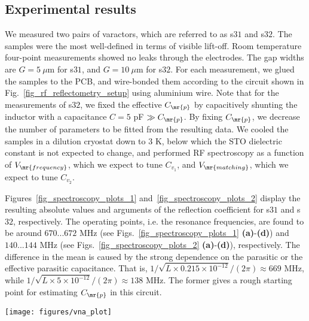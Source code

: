 \documentclass[10pt,a4paper,twoside]{article}
\begin{document}
\begin{multicols}{2}
\section{Experimental results}
We measured two pairs of varactors, which are referred to as s$31$ and s$32$. The samples were the most well-defined in terms of visible lift-off. Room temperature four-point measurements showed no leaks through the electrodes. The gap widths are $G = 5\ \mu$m for s$31$, and $G = 10\ \mu$m for s$32$. 
For each measurement, we glued the samples to the PCB, and wire-bonded them according to the circuit shown in Fig.~\ref{fig_rf_reflectometry_setup} using aluminium wire. Note that for the measurements of s$32$, we fixed the effective $C_{\mr{p}}$ by capacitively shunting the inductor with a capacitance $C = 5$ pF $\gg C_{\mr{p}}$. By fixing $C_{\mr{p}}$, we decrease the number of parameters to be fitted from the resulting data. We cooled the samples in a dilution cryostat down to $3$ K, below which the STO dielectric constant is not expected to change, and performed RF spectroscopy as a function of $V_{\mr{frequency}}$, which we expect to tune $C_{v_1}$, and $V_{\mr{matching}}$, which we expect to tune $C_{v_2}$. 
\par
Figures~\ref{fig_spectroscopy_plots_1} and~\ref{fig_spectroscopy_plots_2} display the resulting absolute values and arguments of the reflection coefficient for s$31$ and s$32$, respectively. The operating points, i.e. the resonance frequencies, are found to be around $670...672$ MHz (see Figs.~\ref{fig_spectroscopy_plots_1} \textbf{(a)}-\textbf{(d)}) and $140...144$ MHz (see Figs.~\ref{fig_spectroscopy_plots_2} \textbf{(a)}-\textbf{(d)}), respectively. The difference in the mean is caused by the strong dependence on the parasitic or the effective parasitic capacitance. That is, $1/\sqrt{L \times 0.215 \times 10^{-12}}/(2\pi) \approx 669$ MHz, while $1/\sqrt{L \times 5 \times 10^{-12}}/(2\pi) \approx 138$ MHz. The former gives a rough starting point for estimating $C_{\mr{p}}$ in this circuit. 
\begin{Figure}
\centering 
\texttt{[image: figures/vna\_plot]}
\label{fig_vna_plot}
\end{Figure}
\par

\end{multicols}
\end{document}
